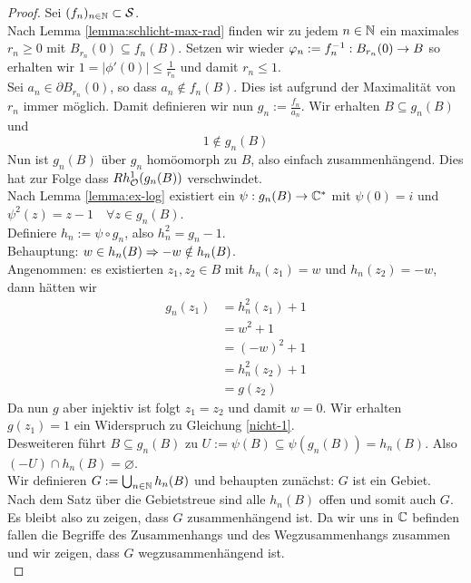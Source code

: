 \begin{proof}
  Sei $(f_n)_{n \in \mathbb{N}} \subset \mathcal{S}$. \\
  Nach Lemma \ref{lemma:schlicht-max-rad}  finden wir zu jedem $n \in \mathbb{N}$
  ein maximales $r_n \geq 0$ mit $B_{r_n}(0) \subseteq f_n(B)$. Setzen wir
  wieder $\varphi_n:=f_n^{-1} : B_{r_n}(0) \rightarrow B$ so erhalten wir $1 =
  |\phi'(0)| \leq \frac{1}{r_n}$ und damit $r_n \leq 1$. \\
  Sei $a_n \in \partial B_{r_n}(0)$, so dass $a_n \notin f_n(B)$. Dies ist
  aufgrund der Maximalität von $r_n$ immer möglich. Damit definieren
  wir nun $g_n := \frac{f_n}{a_n}$. Wir erhalten $B \subseteq g_n(B)$
  und
  \[
  1 \notin g_n(B) \label{nicht-1}\tag{$\ast$}
  \]
  Nun ist $g_n(B)$ über $g_n$ homöomorph zu $B$, also einfach
  zusammenhängend. Dies hat zur Folge dass $Rh_{\mathcal{O}}^1(g_n(B))$
  verschwindet.\\
  Nach Lemma \ref{lemma:ex-log} existiert ein $\psi: g_n(B) \rightarrow \mathbb{C}^\ast$ mit
  $\psi(0) = i$ und $\psi^2(z) = z - 1 \quad \forall z \in g_n(B)$. \\
  Definiere $h_n := \psi \circ g_n$, also $h_n^2 = g_n - 1$. \\
  Behauptung: $w \in h_n(B) \Rightarrow -w \notin h_n(B)$. \\
  Angenommen: es existierten $z_1,z_2 \in B$ mit $h_n(z_1) = w$ und
  $h_n(z_2) = -w$, dann hätten wir
  \begin{align*}
    g_n(z_1) & = h_n^2(z_1) +1 \\
    & = w^2 +1 \\
    & = (-w)^2 +1 \\
    & = h_n^2(z_2) +1 \\
    & = g(z_2)
  \end{align*}
  Da nun $g$ aber injektiv ist folgt $z_1 = z_2$ und damit $w =
  0$. Wir erhalten $g(z_1) = 1$ ein Widerspruch zu Gleichung \eqref{nicht-1}. \\
  Desweiteren führt $B \subseteq g_n(B)$ zu $U:= \psi(B) \subseteq
  \psi(g_n(B)) = h_n(B)$. Also $(-U) \cap h_n(B) = \varnothing$. \\
  Wir definieren $G := \bigcup_{n \in \mathbb{N}} h_n(B)$ und behaupten
  zunächst: $G$ ist ein Gebiet. \\
  Nach dem Satz über die Gebietstreue sind alle $h_n(B)$ offen und
  somit auch $G$. Es bleibt also zu zeigen, dass $G$ zusammenhängend
  ist. Da wir uns in $\mathbb{C}$ befinden fallen die Begriffe des
  Zusammenhangs und des Wegzusammenhangs zusammen und wir zeigen, dass
  $G$ wegzusammenhängend ist.\\

\end{proof}
